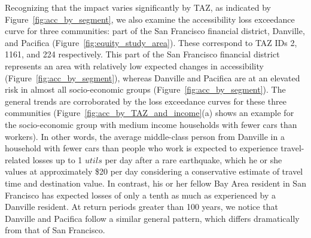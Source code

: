 Recognizing that the impact varies significantly by TAZ, as indicated by Figure~\ref{fig:acc_by_segment},
we also examine the accessibility loss exceedance curve for three communities: part of the San Francisco financial district, Danville, and Pacifica (Figure~\ref{fig:equity_study_area}). These correspond to TAZ IDs 2, 1161, and 224 respectively. This part of the San Francisco financial district  represents an area with relatively low expected changes in accessibility (Figure~\ref{fig:acc_by_segment}), whereas Danville and Pacifica are at an elevated risk in almost all socio-economic groups (Figure~\ref{fig:acc_by_segment}). 
The general trends are corroborated by the loss exceedance curves for these three communities (Figure~\ref{fig:acc_by_TAZ_and_income}{(a)} shows an example for the socio-economic group with medium income households with fewer cars than workers). In other words, the average middle-class person from Danville in a household with fewer cars than people who work is expected to experience travel-related losses up to 1 $utils$ per day after a rare earthquake, which he or she values at approximately \$20 per day considering a conservative estimate of travel time and destination value. In contrast, his or her fellow Bay Area resident in San Francisco has expected losses of only a tenth as much as experienced by a Danville resident. At return periods greater than 100 years, we notice that Danville and Pacifica follow a similar general pattern, which differs dramatically from that of San Francisco. 

